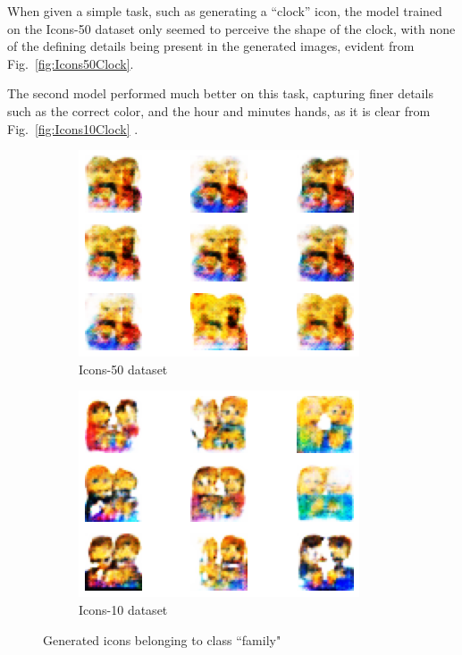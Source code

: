 When given a simple task, such as generating a ``clock'' icon, the model trained on the Icons-50 dataset only seemed to perceive the shape of the clock, with none of the defining details being present in the generated images, evident from Fig.~\ref{fig:Icons50Clock}.

The second model performed much better on this task, capturing finer details such as the correct color, and the hour and minutes hands, as it is clear from Fig.~\ref{fig:Icons10Clock} .

\begin{figure}[htbp]
    \begin{subfigure}[h]{0.4\linewidth}
        \includegraphics[width=\linewidth]{images/gen_icons/icons50_family}
        \caption{Icons-50 dataset}
        \label{fig:Icons50Family}
    \end{subfigure}
    \hfill
    \begin{subfigure}[h]{0.4\linewidth}
        \includegraphics[width=\linewidth]{images/gen_icons/icons10_family}
        \caption{Icons-10 dataset}
        \label{fig:Icons10Family}
    \end{subfigure}
    \caption{Generated icons belonging to class ``family"}
\end{figure}

